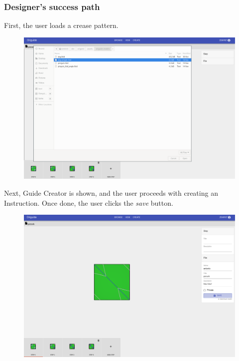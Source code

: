 \subsubsection{Designer's success path}

First, the user loads a crease pattern.

\begin{figure}[H]
  	\centering
    \includegraphics[width=\textwidth]{assets/5-designerLoad.png}
\end{figure}

Next, Guide Creator is shown, and the user proceeds with creating an Instruction.
Once done, the user clicks the \textit{save} button.

\begin{figure}[H]
  	\centering
    \includegraphics[width=\textwidth]{assets/5-designerSave.png}
\end{figure}

